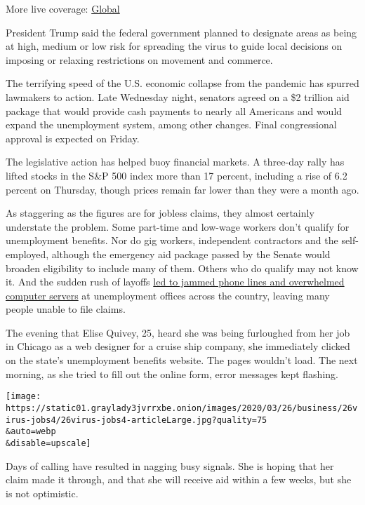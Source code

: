 More live coverage:
\href{https://www.nytimes3xbfgragh.onion/2020/09/08/world/covid-19-coronavirus.html?action=click\&pgtype=Article\&state=default\&region=MAIN_CONTENT_1\&context=storylines_live_updates}{Global}

President Trump said the federal government planned to designate areas
as being at high, medium or low risk for spreading the virus to guide
local decisions on imposing or relaxing restrictions on movement and
commerce.

The terrifying speed of the U.S. economic collapse from the pandemic has
spurred lawmakers to action. Late Wednesday night, senators agreed on a
\$2 trillion aid package that would provide cash payments to nearly all
Americans and would expand the unemployment system, among other changes.
Final congressional approval is expected on Friday.

The legislative action has helped buoy financial markets. A three-day
rally has lifted stocks in the S\&P 500 index more than 17 percent,
including a rise of 6.2 percent on Thursday, though prices remain far
lower than they were a month ago.

As staggering as the figures are for jobless claims, they almost
certainly understate the problem. Some part-time and low-wage workers
don't qualify for unemployment benefits. Nor do gig workers, independent
contractors and the self-employed, although the emergency aid package
passed by the Senate would broaden eligibility to include many of them.
Others who do qualify may not know it. And the sudden rush of layoffs
\href{https://www.nytimes3xbfgragh.onion/2020/03/19/business/coronavirus-unemployment-states.html}{led
to jammed phone lines and overwhelmed computer servers} at unemployment
offices across the country, leaving many people unable to file claims.

The evening that Elise Quivey, 25, heard she was being furloughed from
her job in Chicago as a web designer for a cruise ship company, she
immediately clicked on the state's unemployment benefits website. The
pages wouldn't load. The next morning, as she tried to fill out the
online form, error messages kept flashing.

\texttt{[image: https://static01.graylady3jvrrxbe.onion/images/2020/03/26/business/26virus-jobs4/26virus-jobs4-articleLarge.jpg?quality=75\\\&auto=webp\\\&disable=upscale]}

Days of calling have resulted in nagging busy signals. She is hoping
that her claim made it through, and that she will receive aid within a
few weeks, but she is not optimistic.

